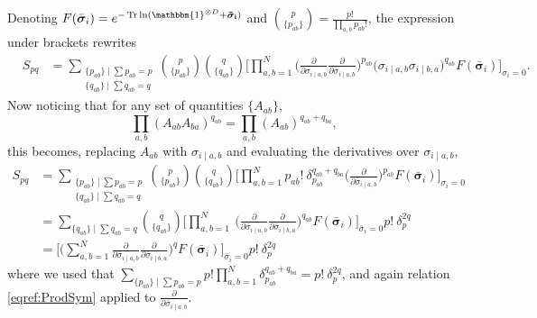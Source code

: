 \documentclass[aps,prd,10pt,notitlepage,nofootinbib,superscriptaddress,showkeys,showpacs]{revtex4-1}
\begin{document}
Denoting $F(\bar{\bm{\sigma}}_i)=e^{-\operatorname{Tr}\ln({\mathbbm{1}}^{\otimes D}+{\bf \bar {\bm{\sigma}} _i})}$ and $\binom{p}{\{p_{ab}\}}=\frac{p!}{\prod_{a,b}p_{ab}!}$, the expression under brackets rewrites
\begin{eqnarray}
&S_{pq}
&=\sum_{  \substack{ {\{p_{ab}\}\mid\sum p_{ab}=p }\\{ \{q_{ab}\}\mid\sum q_{ab}=q } }  } \binom{p}{\{p_{ab}\}}\binom{q}{\{q_{ab}\}}\biggl[ \prod_{a,b=1}^N \biggl(\frac{\partial}{\partial\sigma_{i\mid a,b}}\frac{\partial}{\partial\bar\sigma_{i\mid a,b}} \biggr)^{p_{ab}}  \bigl(\sigma_{i\mid a,b}\sigma_{i\mid b,a}\bigr)^{q_{ab}} F(\bar{\bm{\sigma}}_i) \biggr]_{\sigma_i=0}.\nonumber
\end{eqnarray}
Now noticing that for any set of quantities $\{A_{ab}\}$, 
\begin{equation}
\label{eqref:ProdSym}
\prod_{a,b}(A_{ab}A_{ba})^{q_{ab}}=\prod_{a,b}(A_{ab})^{q_{ab}+q_{ba}},
\end{equation}
this becomes, replacing $A_{ab}$ with $\sigma_{i\mid a,b}$ and evaluating the derivatives over $\sigma_{i\mid a,b}$,
\begin{equation}
\begin{aligned}
S_{pq} &= \sum_{  \substack{ {\{p_{ab}\}\mid\sum p_{ab}=p }\\{ \{q_{ab}\}\mid\sum q_{ab}=q } }  } \binom{p}{\{p_{ab}\}}\binom{q}{\{q_{ab}\}}
\biggl[ \prod_{a,b=1}^N p_{ab}!\ \delta_{p_{ab}}^{q_{ab}+q_{ba}} \biggl(\frac{\partial}{\partial\bar\sigma_{i\mid a,b}}\biggr)^{p_{ab}}F(\bar{\bm{\sigma}}_i) \biggr]_{\sigma_i=0} \\
&=\sum_{ \{q_{ab}\}\mid\sum q_{ab}=q} \binom{q}{\{q_{ab}\}} \biggl[ \prod_{a,b=1}^N \ \biggl(\frac{\partial}{\partial\bar\sigma_{i\mid a,b}}\frac{\partial}{\partial\bar\sigma_{i\mid b,a}}\biggr)^{q_{ab}}F(\bar{\bm{\sigma}}_i) \biggr]_{\bar\sigma_i=0}p!\ \delta_{p}^{2q} \\
&=\biggl[ \biggl(\sum_{a,b=1}^N   \frac{\partial}{\partial\bar\sigma_{i\mid a,b}}\frac{\partial}{\partial\bar\sigma_{i\mid b,a}} \biggr)^q F(\bar{\bm{\sigma}}_i) \biggr]_{\bar\sigma_i=0}p!\ \delta_{p}^{2q}
\end{aligned}
\end{equation}
where we used that $\sum_{ \{p_{ab}\}\mid\sum p_{ab}=p}p!\prod_{a,b=1}^N\delta_{p_{ab}}^{q_{ab}+q_{ba}}=p!\ \delta_{p}^{2q}$, and again relation \eqref{eqref:ProdSym} applied to $\frac{\partial}{\partial\bar\sigma_{i\mid a,b}}$.
\end{document}
